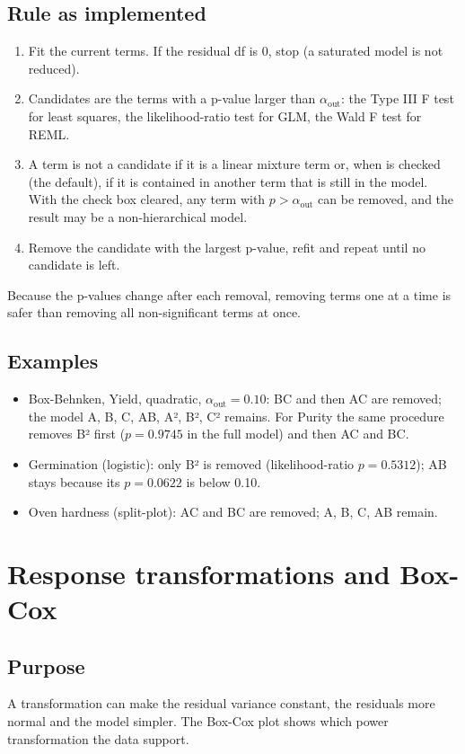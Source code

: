 \subsection*{Rule as implemented}
\begin{enumerate}
  \item Fit the current terms. If the residual df is 0, stop (a saturated model is not reduced).
  \item Candidates are the terms with a p-value larger than $\alpha_{\text{out}}$: the Type III F test for
        least squares, the likelihood-ratio test for GLM, the Wald F test for REML.
  \item A term is not a candidate if it is a linear mixture term or, when  is checked
        (the default), if it is contained in another term that is still in the model. With the check box
        cleared, any term with $p>\alpha_{\text{out}}$ can be removed, and the result may be a
        non-hierarchical model.
  \item Remove the candidate with the largest p-value, refit and repeat until no candidate is left.
\end{enumerate}
Because the p-values change after each removal, removing terms one at a time is safer than removing all
non-significant terms at once.

\subsection*{Examples}
\begin{itemize}
  \item Box-Behnken, Yield, quadratic, $\alpha_{\text{out}}=0.10$: BC and then AC are removed; the model
        A, B, C, AB, A², B², C² remains. For Purity the same procedure removes B² first ($p=0.9745$
        in the full model) and then AC and BC.
  \item Germination (logistic): only B² is removed (likelihood-ratio $p=0.5312$); AB stays because its
        $p=0.0622$ is below 0.10.
  \item Oven hardness (split-plot): AC and BC are removed; A, B, C, AB remain.
\end{itemize}

\section{Response transformations and Box-Cox}\label{sec:ch05-transform}

\subsection*{Purpose}
A transformation can make the residual variance constant, the residuals more normal and the model simpler.
The Box-Cox plot shows which power transformation the data support.


